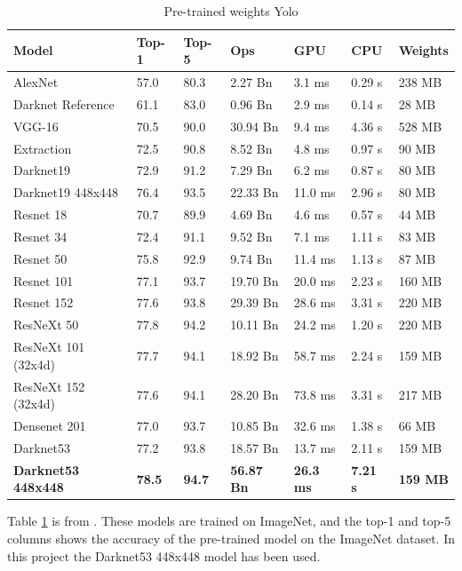 \begin{table}[h!]
\begin{tabular}{lllllll}
Model               & Top-1 & Top-5 & Ops      & GPU     & CPU    & Weights \\ \hline
AlexNet             & 57.0  & 80.3  & 2.27 Bn  & 3.1 ms  & 0.29 s & 238 MB  \\
Darknet Reference   & 61.1  & 83.0  & 0.96 Bn  & 2.9 ms  & 0.14 s & 28 MB   \\
VGG-16              & 70.5  & 90.0  & 30.94 Bn & 9.4 ms  & 4.36 s & 528 MB  \\
Extraction          & 72.5  & 90.8  & 8.52 Bn  & 4.8 ms  & 0.97 s & 90 MB   \\
Darknet19           & 72.9  & 91.2  & 7.29 Bn  & 6.2 ms  & 0.87 s & 80 MB   \\
Darknet19 448x448   & 76.4  & 93.5  & 22.33 Bn & 11.0 ms & 2.96 s & 80 MB   \\
Resnet 18           & 70.7  & 89.9  & 4.69 Bn  & 4.6 ms  & 0.57 s & 44 MB   \\
Resnet 34           & 72.4  & 91.1  & 9.52 Bn  & 7.1 ms  & 1.11 s & 83 MB   \\
Resnet 50           & 75.8  & 92.9  & 9.74 Bn  & 11.4 ms & 1.13 s & 87 MB   \\
Resnet 101          & 77.1  & 93.7  & 19.70 Bn & 20.0 ms & 2.23 s & 160 MB  \\
Resnet 152          & 77.6  & 93.8  & 29.39 Bn & 28.6 ms & 3.31 s & 220 MB  \\
ResNeXt 50          & 77.8  & 94.2  & 10.11 Bn & 24.2 ms & 1.20 s & 220 MB  \\
ResNeXt 101 (32x4d) & 77.7  & 94.1  & 18.92 Bn & 58.7 ms & 2.24 s & 159 MB  \\
ResNeXt 152 (32x4d) & 77.6  & 94.1  & 28.20 Bn & 73.8 ms & 3.31 s & 217 MB  \\
Densenet 201        & 77.0  & 93.7  & 10.85 Bn & 32.6 ms & 1.38 s & 66 MB   \\
Darknet53           & 77.2  & 93.8  & 18.57 Bn & 13.7 ms & 2.11 s & 159 MB  \\
\textbf{Darknet53 448x448}   & \textbf{78.5}  & \textbf{94.7}  & \textbf{56.87 Bn} & \textbf{26.3 ms} & \textbf{7.21 s} & \textbf{159 MB} 
\end{tabular}
\caption{Pre-trained weights Yolo}
\label{yolo_tab}
\end{table}

Table \ref{yolo_tab} is from \cite{YOLOv3}. These models are trained on ImageNet, and the top-1 and top-5 columns shows the accuracy of the pre-trained model on the ImageNet dataset. In this project the Darknet53 448x448 model has been used. 



